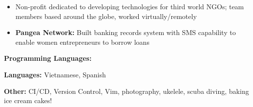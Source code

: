 \documentclass[10pt,a4paper,ragged2e]{altacv}
\begin{document}
\divider \newline
{}
\begin{itemize}
\item {Non-profit dedicated to developing technologies for third world NGOs; team members based around the globe, worked virtually/remotely} \item{\textbf{Pangea Network:} Built banking records system with SMS capability to enable women entrepreneurs to borrow loans}
\end{itemize}




\textbf{Programming Languages:}
 \hspace{-2em}  \hspace{-2em} 


\vspace{.5em}
\noindent\textbf{Languages:} Vietnamese, Spanish \smallskip


\noindent\textbf{Other:} CI/CD, Version Control, Vim, photography, ukelele, scuba diving, baking ice cream cakes! \smallskip

\begin{fullwidth}
\end{fullwidth}

\clearpage


\nocite{*}






\end{document}
